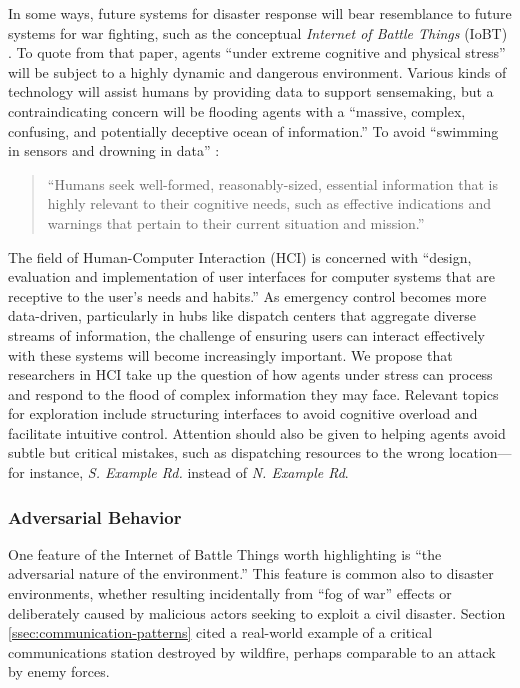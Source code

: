 \documentclass[]             %
{NASA}                       %
\theoremstyle{definition}
\begin{document}
In some ways, future systems for disaster response will bear
resemblance to future systems for war fighting, such as the conceptual
\emph{Internet of Battle Things} (IoBT) \cite{2016:iobt}. To quote
from that paper, agents ``under extreme cognitive and physical
stress'' will be subject to a highly dynamic and dangerous
environment. Various kinds of technology will assist humans by
providing data to support sensemaking, but a contraindicating concern
will be flooding agents with a ``massive, complex, confusing, and
potentially deceptive ocean of information.'' To avoid ``swimming in
sensors and drowning in data'' \cite{2010:magnuson}:
\begin{quote}
``Humans seek well-formed, reasonably-sized, essential information
  that is highly relevant to their cognitive needs, such as effective
  indications and warnings that pertain to their current situation and
  mission.'' \cite{2016:iobt}
\end{quote}

The field of Human-Computer Interaction (HCI) is concerned with
``design, evaluation and implementation of user interfaces for
computer systems that are receptive to the user's needs and habits.''
\cite{2009:hci-definition} As emergency control becomes more
data-driven, particularly in hubs like dispatch centers that aggregate
diverse streams of information, the challenge of ensuring users can
interact effectively with these systems will become increasingly
important. We propose that researchers in HCI take up the question of
how agents under stress can process and respond to the flood of
complex information they may face. Relevant topics for exploration
include structuring interfaces to avoid cognitive overload and
facilitate intuitive control. Attention should also be given to
helping agents avoid subtle but critical mistakes, such as dispatching
resources to the wrong location---for instance, \emph{S. Example Rd.}
instead of \emph{N. Example Rd}.


\subsubsection{Adversarial Behavior}
One feature of the Internet of Battle Things worth highlighting is
``the adversarial nature of the environment.'' This feature is common
also to disaster environments, whether resulting incidentally from
``fog of war'' effects or deliberately caused by malicious actors
seeking to exploit a civil disaster. Section
\ref{ssec:communication-patterns} cited a real-world example of a
critical communications station destroyed by wildfire, perhaps
comparable to an attack by enemy forces.
\end{document}
